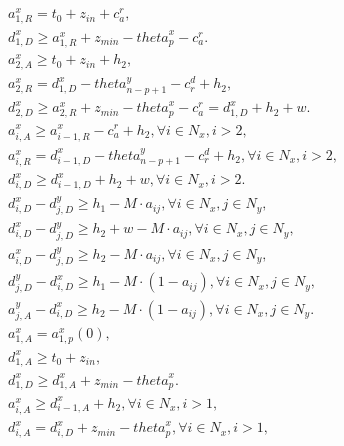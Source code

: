 \begin{align}
  & a_{1 , R}^{x} = t_{0} + z_{i n} + c_{a}^{r} , \tag{eq\_0019} \\
  & d_{1 , D}^{x} \geq a_{1 , R}^{x} + z_{\mathit{min}} - \mathit{theta}_{p}^{x} - c_{a}^{r} . \tag{eq\_0020} \\
  & a_{2 , A}^{x} \geq t_{0} + z_{i n} + h_{2} , \tag{eq\_0021} \\
  & a_{2 , R}^{x} = d_{1 , D}^{x} - \mathit{theta}_{n - p + 1}^{y} - c_{r}^{d} + h_{2} , \tag{eq\_0022} \\
  & d_{2 , D}^{x} \geq a_{2 , R}^{x} + z_{\mathit{min}} - \mathit{theta}_{p}^{x} - c_{a}^{r} = d_{1 , D}^{x} + h_{2} + w . \tag{eq\_0023} \\
  & a_{i , A}^{x} \geq a_{i - 1 , R}^{x} - c_{a}^{r} + h_{2} , \forall i \in N_{x} , i > 2 , \tag{eq\_0024} \\
  & a_{i , R}^{x} = d_{i - 1 , D}^{x} - \mathit{theta}_{n - p + 1}^{y} - c_{r}^{d} + h_{2} , \forall i \in N_{x} , i > 2 , \tag{eq\_0025} \\
  & d_{i , D}^{x} \geq d_{i - 1 , D}^{x} + h_{2} + w , \forall i \in N_{x} , i > 2 . \tag{eq\_0026} \\
  & d_{i , D}^{x} - d_{j , D}^{y} \geq h_{1} - M \cdot a_{i j} , \forall i \in N_{x} , j \in N_{y} , \tag{eq\_0027} \\
  & d_{i , D}^{x} - d_{j , D}^{y} \geq h_{2} + w - M \cdot a_{i j} , \forall i \in N_{x} , j \in N_{y} , \tag{eq\_0028} \\
  & a_{i , D}^{x} - d_{j , D}^{y} \geq h_{2} - M \cdot a_{i j} , \forall i \in N_{x} , j \in N_{y} , \tag{eq\_0029} \\
  & d_{j , D}^{y} - d_{i , D}^{x} \geq h_{1} - M \cdot \left(1 - a_{i j}\right) , \forall i \in N_{x} , j \in N_{y} , \tag{eq\_0030} \\
  & a_{j , A}^{y} - d_{i , D}^{x} \geq h_{2} - M \cdot \left(1 - a_{i j}\right) , \forall i \in N_{x} , j \in N_{y} . \tag{eq\_0031} \\
  & a_{1 , A}^{x} = a_{1 , p}^{x} \left(0\right) , \tag{eq\_0032} \\
  & d_{1 , A}^{x} \geq t_{0} + z_{i n} , \tag{eq\_0033} \\
  & d_{1 , D}^{x} \geq d_{1 , A}^{x} + z_{\mathit{min}} - \mathit{theta}_{p}^{x} . \tag{eq\_0034} \\
  & a_{i , A}^{x} \geq d_{i - 1 , A}^{x} + h_{2} , \forall i \in N_{x} , i > 1 , \tag{eq\_0035} \\
  & d_{i , A}^{x} = d_{i , D}^{x} + z_{\mathit{min}} - \mathit{theta}_{p}^{x} , \forall i \in N_{x} , i > 1 , \tag{eq\_0036} \\

\end{align}
